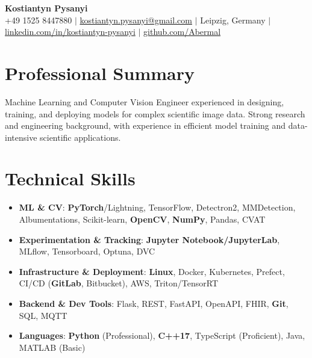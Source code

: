 \documentclass[letterpaper,10pt]{article}
\newcommand{\resumeItem}[1]{
    \item\small{#1}\vspace{-0.5pt}
}
\newcommand{\resumeSubHeadingList}{\begin{itemize}[leftmargin=0.15in, label={}]\vspace{-2pt}}
\newcommand{\resumeSubHeadingListEnd}{\end{itemize}}
\begin{document}
\begin{center}
  \textbf{\Huge Kostiantyn Pysanyi}\vspace{4pt} \\
  \small +49 1525 8447880 $|$ \href{mailto:kostiantyn.pysanyi@gmail.com}{kostiantyn.pysanyi@gmail.com} $|$ Leipzig, Germany $|$
  \href{https://www.linkedin.com/in/kostiantyn-pysanyi/}{linkedin.com/in/kostiantyn-pysanyi} $|$ \href{https://github.com/Abermal}{github.com/Abermal}
\end{center}




\section{Professional Summary}
Machine Learning and Computer Vision Engineer experienced in designing, training, and deploying models for complex scientific image data. Strong research and engineering background, with experience in efficient model training and data-intensive scientific applications.

\section{Technical Skills}
\resumeSubHeadingList
  \resumeItem{\textbf{ML \& CV}: \textbf{PyTorch}/Lightning, TensorFlow, Detectron2, MMDetection, Albumentations, Scikit-learn, \textbf{OpenCV}, \textbf{NumPy}, Pandas, CVAT}
  \resumeItem{\textbf{Experimentation \& Tracking}: \textbf{Jupyter Notebook/JupyterLab}, MLflow, Tensorboard, Optuna, DVC}
  \resumeItem{\textbf{Infrastructure \& Deployment}: \textbf{Linux}, Docker, Kubernetes, Prefect, CI/CD (\textbf{GitLab}, Bitbucket), AWS, Triton/TensorRT}
  \resumeItem{\textbf{Backend \& Dev Tools}: Flask, REST, FastAPI, OpenAPI, FHIR, \textbf{Git}, SQL, MQTT}
  \resumeItem{\textbf{Languages}: \textbf{Python} (Professional), \textbf{C++17}, TypeScript (Proficient), Java, MATLAB (Basic)}
\resumeSubHeadingListEnd
\end{document}
